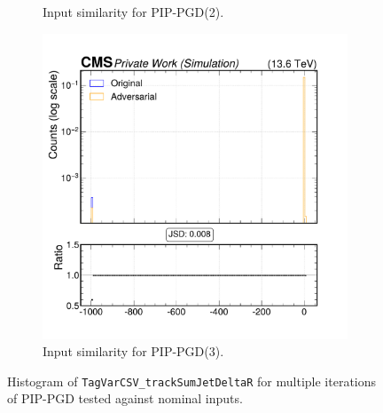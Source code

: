 \begin{figure}[htbp]
\begin{subfigure}[t]{0.32\textwidth}
    \caption*{Input similarity for PIP-PGD(2).}
  \end{subfigure}\hfill
  \begin{subfigure}[t]{0.32\textwidth}
    \includegraphics[width=\linewidth]{media/output/features/compare/combined_it_3/cmp_global_features_TagVarCSV_trackSumJetDeltaR.pdf}
    \caption*{Input similarity for PIP-PGD(3).}
  \end{subfigure}

  \caption*{Histogram of \texttt{TagVarCSV\_trackSumJetDeltaR} for multiple iterations of PIP-PGD tested against nominal inputs.}
  \label{fig:combined_input_TagVarCSV_trackSumJetDeltaR}
\end{figure}

